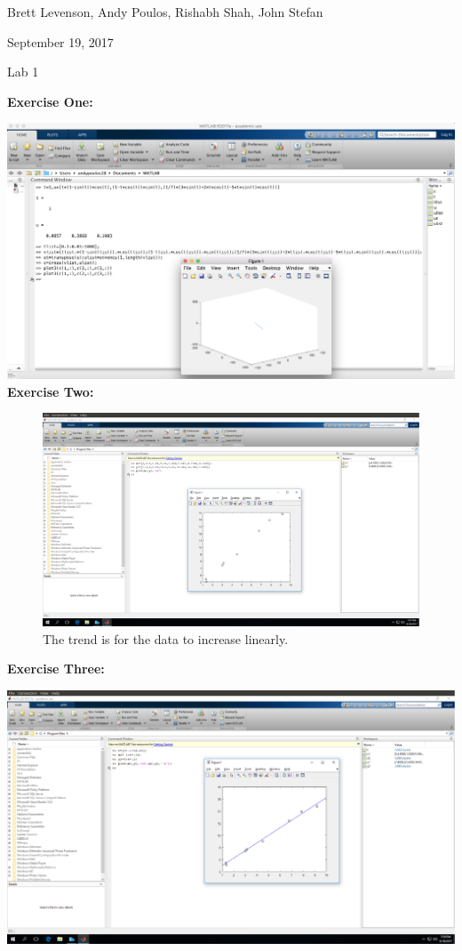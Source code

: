 \documentclass[11pt]{article}
\begin{document}
{\Large\noindent Brett Levenson, Andy Poulos, Rishabh Shah, John Stefan

\noindent September 19, 2017

\noindent Lab 1 \\}

\noindent\textbf{Exercise One:}

\noindent\includegraphics[scale=0.3]{One} \\

\noindent\textbf{Exercise Two:}

\begin{figure}[H]
	\caption{The trend is for the data to increase linearly.}
	\includegraphics[scale=0.25]{Two}
\end{figure}

\newpage

\noindent\textbf{Exercise Three:}

\noindent\includegraphics[scale=0.25]{Three} \\
\end{document}
